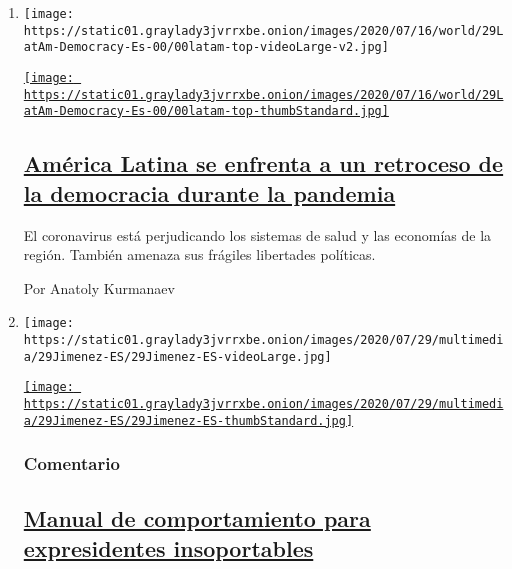 \begin{enumerate}
\def\labelenumi{\arabic{enumi}.}
\item
  \texttt{[image: https://static01.graylady3jvrrxbe.onion/images/2020/07/16/world/29LatAm-Democracy-Es-00/00latam-top-videoLarge-v2.jpg]}

  \href{/es/2020/07/29/espanol/democracia-america-latina-pandemia.html}{\texttt{[image: https://static01.graylady3jvrrxbe.onion/images/2020/07/16/world/29LatAm-Democracy-Es-00/00latam-top-thumbStandard.jpg]}}

  \hypertarget{amuxe9rica-latina-se-enfrenta-a-un-retroceso-de-la-democracia-durante-la-pandemia}{%
  \subsection{\texorpdfstring{\href{/es/2020/07/29/espanol/democracia-america-latina-pandemia.html}{América
  Latina se enfrenta a un retroceso de la democracia durante la
  pandemia}}{América Latina se enfrenta a un retroceso de la democracia durante la pandemia}}\label{amuxe9rica-latina-se-enfrenta-a-un-retroceso-de-la-democracia-durante-la-pandemia}}

  El coronavirus está perjudicando los sistemas de salud y las economías
  de la región. También amenaza sus frágiles libertades políticas.

  Por Anatoly Kurmanaev
\item
  \texttt{[image: https://static01.graylady3jvrrxbe.onion/images/2020/07/29/multimedia/29Jimenez-ES/29Jimenez-ES-videoLarge.jpg]}

  \href{/es/2020/07/29/espanol/opinion/espana-felipe-gonzalez-jose-maria-aznar.html}{\texttt{[image: https://static01.graylady3jvrrxbe.onion/images/2020/07/29/multimedia/29Jimenez-ES/29Jimenez-ES-thumbStandard.jpg]}}

  \hypertarget{comentario}{%
  \subsubsection{Comentario}\label{comentario}}

  \hypertarget{manual-de-comportamiento-para-expresidentes-insoportables}{%
  \subsection{\texorpdfstring{\href{/es/2020/07/29/espanol/opinion/espana-felipe-gonzalez-jose-maria-aznar.html}{Manual
  de comportamiento para expresidentes
  insoportables}}{Manual de comportamiento para expresidentes insoportables}}\label{manual-de-comportamiento-para-expresidentes-insoportables}}


\end{enumerate}
